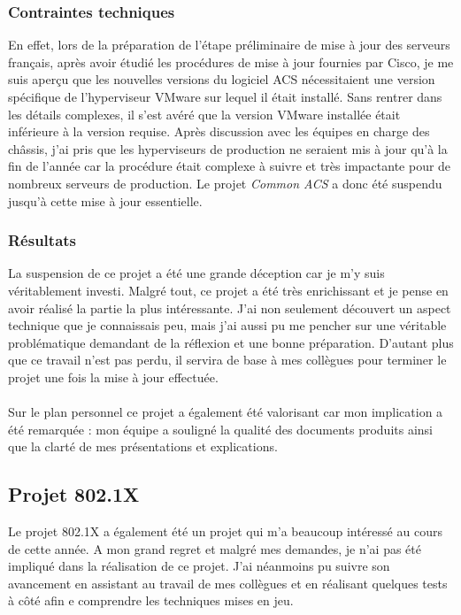\documentclass[a4paper,12pt]{report}
\begin{document}
\subsubsection{Contraintes techniques}
En effet, lors de la préparation de l'étape préliminaire de mise à jour des serveurs français, après avoir étudié les procédures de mise à jour  fournies par Cisco, je me suis aperçu que les nouvelles versions du logiciel ACS nécessitaient une version spécifique de l'hyperviseur VMware sur lequel il était installé. Sans rentrer dans les détails complexes, il s'est avéré que la version VMware installée était inférieure à la version requise. Après discussion avec les équipes en charge des châssis, j'ai pris que les hyperviseurs de production ne seraient mis à jour qu'à la fin de l'année car la procédure était complexe à suivre et très impactante pour de nombreux serveurs de production. Le projet \textit{Common ACS} a donc été suspendu jusqu'à cette mise à jour essentielle. 

\subsubsection{Résultats}
La suspension de ce projet a été une grande déception car je m'y suis véritablement investi. Malgré tout, ce projet a été très enrichissant et je pense en avoir réalisé la partie la plus intéressante. J'ai non seulement découvert un aspect technique que je connaissais peu, mais j'ai aussi pu me pencher sur une véritable problématique demandant de la réflexion et une bonne préparation. D'autant plus que ce travail n'est pas perdu, il servira de base à mes collègues pour terminer le projet une fois la mise à jour effectuée.
\paragraph{}
Sur le plan personnel ce projet a également été valorisant car mon implication a été remarquée : mon équipe a souligné la qualité des documents produits ainsi que la clarté de mes présentations et explications.

\subsection{Projet 802.1X} \label{802.1x} %
Le projet 802.1X a également été un projet qui m'a beaucoup intéressé au cours de cette année. A mon grand regret et malgré mes demandes, je n'ai pas été impliqué dans la réalisation de ce projet. J'ai néanmoins pu suivre son avancement en assistant au travail de mes collègues et en réalisant quelques tests à côté afin e comprendre les techniques mises en jeu.
\end{document}
